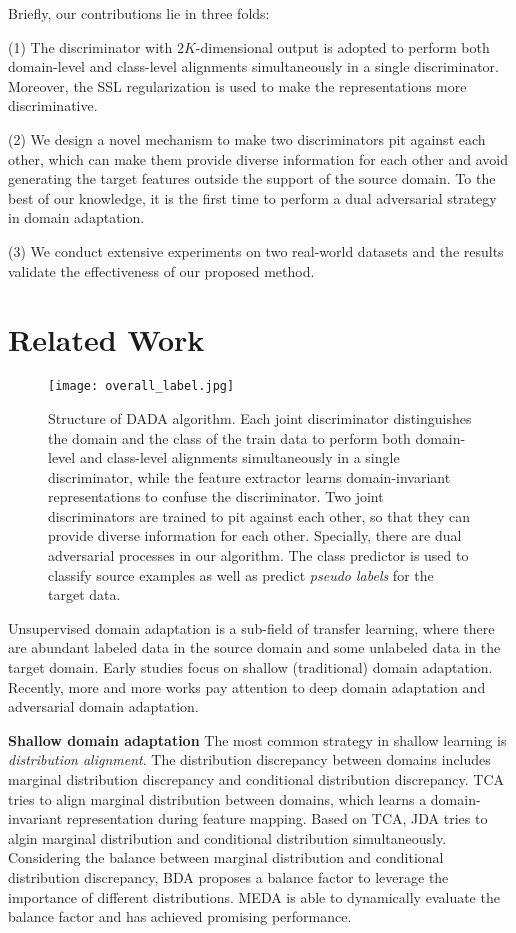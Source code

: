 \documentclass{ecai}
\begin{document}
Briefly, our contributions lie in three folds:

(1) The discriminator with $2K$-dimensional output is adopted to perform both domain-level and class-level alignments simultaneously in a single discriminator. Moreover, the SSL regularization is used to make the representations more discriminative.

(2) We design a novel mechanism to make two discriminators pit against each other, which can make them provide diverse information for each other and avoid generating the target features outside the support of the source domain. To the best of our knowledge, it is the first time to perform a dual adversarial strategy in domain adaptation.

(3) We conduct extensive experiments on two real-world datasets  and the results validate the effectiveness of our proposed method.


\section{Related Work}


\begin{figure*}[htbp]
\begin{center}
\texttt{[image: overall\_label.jpg]}
\end{center}
\caption{ Structure of DADA algorithm. Each joint discriminator distinguishes the domain and the class of the train data to perform both domain-level and class-level alignments simultaneously in a single discriminator, while the feature extractor learns domain-invariant representations to confuse the discriminator. Two  joint discriminators are trained to pit against each other, so that they can provide diverse information for each other. Specially, there are dual adversarial processes in our algorithm. The class predictor is used to classify source examples as well as predict {\emph{pseudo labels}} for the target data.}
\label{network}
\end{figure*}

Unsupervised domain adaptation is a sub-field of transfer learning, where there are abundant labeled data in the source domain and some unlabeled data in the target domain.  Early studies focus on shallow (traditional) domain adaptation. Recently, more and more works pay attention to deep domain adaptation and adversarial domain adaptation.

\textbf{Shallow domain adaptation} The most common strategy in shallow learning is {\emph{distribution alignment}}. The distribution discrepancy between domains includes marginal distribution discrepancy and conditional distribution discrepancy. TCA\cite{b4} tries to align marginal distribution between domains, which learns a domain-invariant representation during feature mapping. Based on TCA, JDA\cite{b5} tries to algin marginal distribution and conditional distribution simultaneously. Considering the balance between marginal distribution and conditional distribution discrepancy, BDA\cite{b7} proposes a balance factor to leverage the importance of different distributions. MEDA\cite{b22} is able to dynamically evaluate the balance factor and has achieved promising performance.
\end{document}
